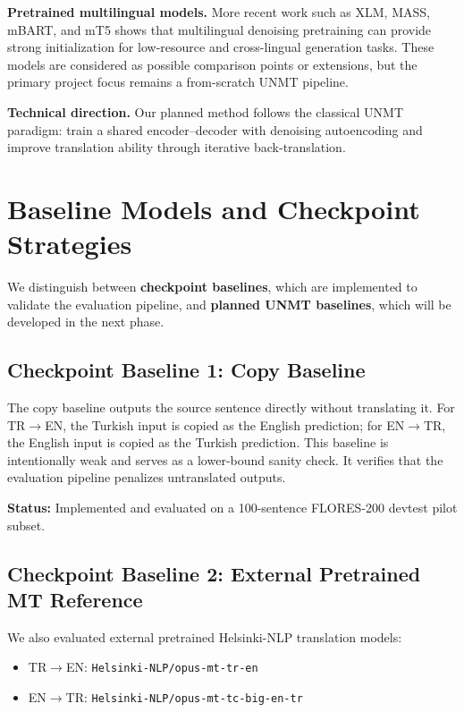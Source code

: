 \documentclass[11pt]{article}
\begin{document}
\textbf{Pretrained multilingual models.} More recent work such as XLM, MASS, mBART, and mT5 shows that multilingual denoising pretraining can provide strong initialization for low-resource and cross-lingual generation tasks. These models are considered as possible comparison points or extensions, but the primary project focus remains a from-scratch UNMT pipeline.

\textbf{Technical direction.} Our planned method follows the classical UNMT paradigm: train a shared encoder--decoder with denoising autoencoding and improve translation ability through iterative back-translation.

\section{Baseline Models and Checkpoint Strategies}

We distinguish between \textbf{checkpoint baselines}, which are implemented to validate the evaluation pipeline, and \textbf{planned UNMT baselines}, which will be developed in the next phase.

\subsection{Checkpoint Baseline 1: Copy Baseline}

The copy baseline outputs the source sentence directly without translating it. For TR$\rightarrow$EN, the Turkish input is copied as the English prediction; for EN$\rightarrow$TR, the English input is copied as the Turkish prediction. This baseline is intentionally weak and serves as a lower-bound sanity check. It verifies that the evaluation pipeline penalizes untranslated outputs.

\textbf{Status:} Implemented and evaluated on a 100-sentence FLORES-200 devtest pilot subset.

\subsection{Checkpoint Baseline 2: External Pretrained MT Reference}

We also evaluated external pretrained Helsinki-NLP translation models:
\begin{itemize}
    \item TR$\rightarrow$EN: \texttt{Helsinki-NLP/opus-mt-tr-en}
    \item EN$\rightarrow$TR: \texttt{Helsinki-NLP/opus-mt-tc-big-en-tr}
\end{itemize}
\end{document}
